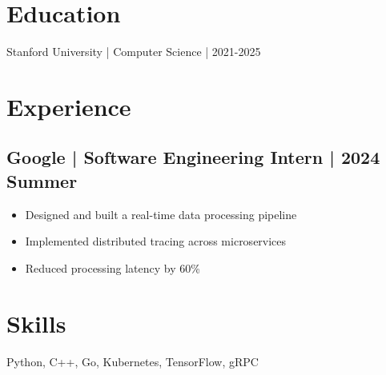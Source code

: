 \documentclass{article}
\begin{document}
\section{Education}
Stanford University | Computer Science | 2021-2025

\section{Experience}
\subsection{Google | Software Engineering Intern | 2024 Summer}
\begin{itemize}
\item Designed and built a real-time data processing pipeline
\item Implemented distributed tracing across microservices
\item Reduced processing latency by 60\%
\end{itemize}

\section{Skills}
Python, C++, Go, Kubernetes, TensorFlow, gRPC
\end{document}
